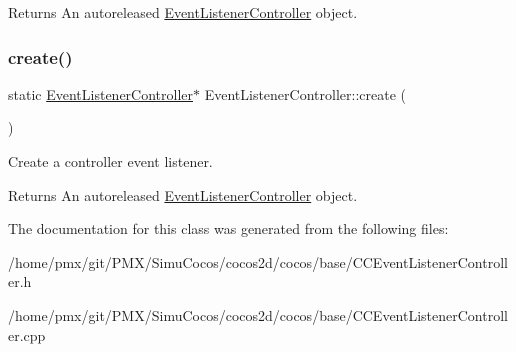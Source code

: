 \begin{DoxyReturn}{Returns}
An autoreleased \hyperlink{classEventListenerController}{Event\+Listener\+Controller} object. 
\end{DoxyReturn}
\mbox{\label{classEventListenerController_ae5ee6f1ac95d7711e488c6b34f5ef128}} 
\subsubsection{\texorpdfstring{create()}{create()}\hspace{0.1cm}{\footnotesize\ttfamily [2/2]}}
{\footnotesize\ttfamily static \hyperlink{classEventListenerController}{Event\+Listener\+Controller}$\ast$ Event\+Listener\+Controller\+::create (\begin{DoxyParamCaption}{ }\end{DoxyParamCaption})\hspace{0.3cm}{\ttfamily [static]}}

Create a controller event listener.

\begin{DoxyReturn}{Returns}
An autoreleased \hyperlink{classEventListenerController}{Event\+Listener\+Controller} object. 
\end{DoxyReturn}


The documentation for this class was generated from the following files\+:\begin{DoxyCompactItemize}
\item 
/home/pmx/git/\+P\+M\+X/\+Simu\+Cocos/cocos2d/cocos/base/C\+C\+Event\+Listener\+Controller.\+h\item 
/home/pmx/git/\+P\+M\+X/\+Simu\+Cocos/cocos2d/cocos/base/C\+C\+Event\+Listener\+Controller.\+cpp\end{DoxyCompactItemize}
